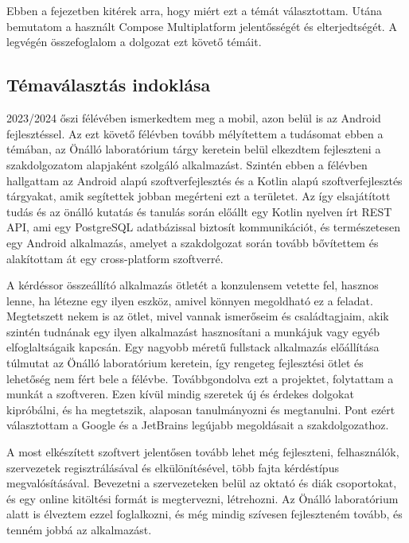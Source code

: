 \chapter{\bevezetes}

Ebben a fejezetben kitérek arra, hogy miért ezt a témát választottam. Utána bemutatom a használt Compose Multiplatform jelentősségét és elterjedtségét. A legvégén összefoglalom a dolgozat ezt követő témáit.

\section{Témaválasztás indoklása}

2023/2024 őszi félévében ismerkedtem meg a mobil, azon belül is az Android fejlesztéssel.
Az ezt követő félévben tovább mélyítettem a tudásomat ebben a témában, az Önálló laboratórium tárgy keretein belül elkezdtem fejleszteni a szakdolgozatom alapjaként szolgáló alkalmazást.
Szintén ebben a félévben hallgattam az Android alapú szoftverfejlesztés és a Kotlin alapú szoftverfejlesztés tárgyakat, amik segítettek jobban megérteni ezt a területet.
Az így elsajátított tudás és az önálló kutatás és tanulás során előállt egy Kotlin nyelven írt REST API, ami egy PostgreSQL adatbázissal biztosít kommunikációt, és természetesen egy Android alkalmazás, amelyet a szakdolgozat során tovább bővítettem és alakítottam át egy cross-platform szoftverré.

A kérdéssor összeállító alkalmazás ötletét a konzulensem vetette fel, hasznos lenne, ha létezne egy ilyen eszköz, amivel könnyen megoldható ez a feladat.
Megtetszett nekem is az ötlet, mivel vannak ismerőseim és családtagjaim, akik szintén tudnának egy ilyen alkalmazást hasznosítani a munkájuk vagy egyéb elfoglaltságaik kapcsán.
Egy nagyobb méretű fullstack alkalmazás előállítása túlmutat az Önálló laboratórium keretein, így rengeteg fejlesztési ötlet és lehetőség nem fért bele a félévbe.
Továbbgondolva ezt a projektet, folytattam a munkát a szoftveren.
Ezen kívül mindig szeretek új és érdekes dolgokat kipróbálni, és ha megtetszik, alaposan tanulmányozni és megtanulni.
Pont ezért választottam a Google és a JetBrains legújabb megoldásait a szakdolgozathoz.

A most elkészített szoftvert jelentősen tovább lehet még fejleszteni, felhasználók, szervezetek regisztrálásával és elkülönítésével, több fajta kérdéstípus megvalósításával.
Bevezetni a szervezeteken belül az oktató és diák csoportokat, és egy online kitöltési formát is megtervezni, létrehozni.
Az Önálló laboratórium alatt is élveztem ezzel foglalkozni, és még mindig szívesen fejleszteném tovább, és tenném jobbá az alkalmazást.

